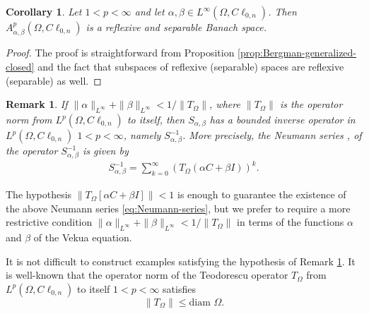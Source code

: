 \documentclass[12pt]{article}
\newtheorem{corollary}[theorem]{Corollary}
\newtheorem{remark}[theorem]{Remark}
\begin{document}
\begin{corollary}\label{cor:reflexive-separable}
Let $1< p<\infty$ and let $\alpha, \beta\in L^{\infty}(\Omega,C\ell_{0,n})$. Then $A_{\alpha,\beta}^p(\Omega,C\ell_{0,n})$ is a reflexive and separable Banach space.
\end{corollary}
\begin{proof}
The proof is straightforward from Proposition \ref{prop:Bergman-generalized-closed} and the fact that subspaces of reflexive (separable) spaces are reflexive (separable) as well.
\end{proof}
\begin{remark}\label{rmk:Neumann-serie}
If $\|\alpha\|_{L^{\infty}}+\|\beta \|_{L^{\infty}}< 1/\|T_{\Omega}\|$, where $\|T_{\Omega}\|$ is the operator norm from $L^p(\Omega,C\ell_{0,n})$ to itself, then $S_{\alpha,\beta}$ has a bounded inverse operator in $L^p(\Omega,C\ell_{0,n})$ $1<p<\infty$, namely $S_{\alpha,\beta}^{-1}$. More precisely, the Neumann series \cite[Prop.\ 9.13]{Teschl2012}, \cite[Th.\ 1.3]{Kub2012} of the operator $S_{\alpha,\beta}^{-1}$ is given by
\begin{align}\label{eq:Neumann-series}
   S_{\alpha,\beta}^{-1}=\sum_{k=0}^{\infty} 
	 (T_{\Omega}(\alpha C+\beta I))^k.
\end{align}
\end{remark}
The hypothesis $\|T_{\Omega}[\alpha C+\beta I]\|<1$ is enough to guarantee the existence of the above Neumann series \eqref{eq:Neumann-series}, but we prefer to require a more restrictive condition $\|\alpha\|_{L^{\infty}}+\|\beta \|_{L^{\infty}}< 1/\|T_{\Omega}\|$ in terms of the functions $\alpha$ and $\beta$ of the Vekua equation.

It is not difficult to construct examples satisfying the hypothesis of Remark \ref{rmk:Neumann-serie}. It is well-known that the operator norm of the Teodorescu operator $T_{\Omega}$ from $L^p(\Omega, C\ell_{0,n})$ to itself \cite[Cor.\ 3.17]{GuSpr1997} $1<p<\infty$ satisfies 
\[
  \|T_{\Omega}\|\leq \text{diam }\Omega.
\]

\end{document}
